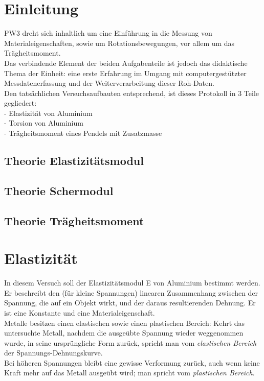 \documentclass[12pt,a4paper]{article}
\begin{document}
\pagebreak
\setlength{\columnsep}{20pt}
\begin{multicols}{2}
\section{Einleitung}
PW3 dreht sich inhaltlich um eine Einführung in die Messung von Materialeigenschaften, sowie um Rotationsbewegungen, vor allem um das Trägheitsmoment.\\
Das verbindende Element der beiden Aufgabenteile ist jedoch das didaktische Thema der Einheit: eine erste Erfahrung im Umgang mit computergestützter Messdatenerfassung und der Weiterverarbeitung dieser Roh-Daten.\\
Den tatsächlichen Versuchsaufbauten entsprechend, ist dieses Protokoll in 3 Teile gegliedert:\\
- Elastizität von Aluminium\\
- Torsion von Aluminium\\
- Trägheitsmoment eines Pendels mit Zusatzmasse

\subsection{Theorie Elastizitätsmodul}

\subsection{Theorie Schermodul}

\subsection{Theorie Trägheitsmoment}

\section{Elastizität}



In diesem Versuch soll der Elastizitätsmodul E von Aluminium bestimmt werden.\\
Er beschreibt den (für kleine Spannungen) linearen Zusammenhang zwischen der Spannung, die auf ein Objekt wirkt, und der daraus resultierenden Dehnung. Er ist eine Konstante und eine Materialeigenschaft.\\
Metalle besitzen einen elastischen sowie einen plastischen Bereich: Kehrt das untersuchte Metall, nachdem die ausgeübte Spannung wieder weggenommen wurde, in seine ursprüngliche Form zurück, spricht man vom \textit{elastischen Bereich} der Spannungs-Dehnungskurve.\\
Bei höheren Spannungen bleibt eine gewisse Verformung zurück, auch wenn keine Kraft mehr auf das Metall ausgeübt wird; man spricht vom \textit{plastischen Bereich}.



\end{multicols}
\end{document}
